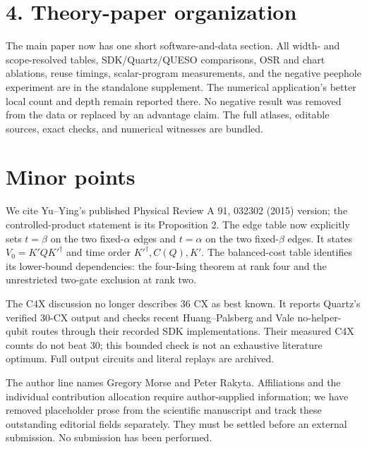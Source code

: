 \documentclass[11pt]{article}
\begin{document}
\section*{4. Theory-paper organization}
The main paper now has one short software-and-data section. All width- and
scope-resolved tables, SDK/Quartz/QUESO comparisons, OSR and chart ablations,
reuse timings, scalar-program measurements, and the negative peephole
experiment are in the standalone supplement. The numerical application's
better local count and depth remain reported there. No negative result was
removed from the data or replaced by an advantage claim. The full atlases,
editable sources, exact checks, and numerical witnesses are bundled.

\section*{Minor points}
We cite Yu--Ying's published Physical Review A 91, 032302 (2015) version;
the controlled-product statement is its Proposition 2.
The edge table now explicitly sets $t=\beta$ on the two fixed-$\alpha$
edges and $t=\alpha$ on the two fixed-$\beta$ edges. It states
$V_0=K'QK'^\dagger$ and time order $K'^\dagger,C(Q),K'$.
The balanced-cost table identifies its lower-bound dependencies: the
four-Ising theorem at rank four and the unrestricted two-gate exclusion
at rank two.

The C4X discussion no longer describes 36 CX as best known. It reports
Quartz's verified 30-CX output and checks recent Huang--Palsberg and Vale
no-helper-qubit routes through their recorded SDK implementations. Their
measured C4X counts do not beat 30; this bounded check is not an exhaustive
literature optimum. Full output circuits and literal replays are archived.

The author line names Gregory Morse and Peter Rakyta. Affiliations and the
individual contribution allocation require author-supplied information;
we have removed placeholder prose from the scientific manuscript and
track these outstanding editorial fields separately. They must be settled
before an external submission. No submission has been performed.
\end{document}
